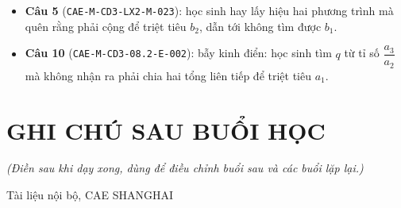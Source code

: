 \documentclass[11pt, a4paper]{article}
\begin{document}
\begin{itemize}[leftmargin=1.4em, itemsep=2pt]
\item \textbf{Câu 5} (\texttt{CAE-M-CD3-LX2-M-023}): học sinh hay lấy hiệu hai phương trình mà quên rằng phải cộng để triệt tiêu $b_2$, dẫn tới không tìm được $b_1$.
\item \textbf{Câu 10} (\texttt{CAE-M-CD3-08.2-E-002}): bẫy kinh điển: học sinh tìm $q$ từ tỉ số $\dfrac{a_3}{a_2}$ mà không nhận ra phải chia hai tổng liên tiếp để triệt tiêu $a_1$.
\end{itemize}

\section{GHI CHÚ SAU BUỔI HỌC}

\emph{(Điền sau khi dạy xong, dùng để điều chỉnh buổi sau và các buổi lặp lại.)}

\vspace{0.8cm}
\begin{center}
{\footnotesize\color{cae_blue} Tài liệu nội bộ, CAE SHANGHAI}
\end{center}
\end{document}

